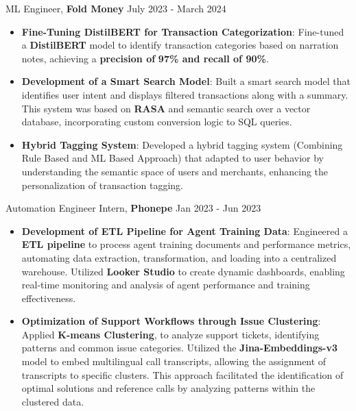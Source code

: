 \documentclass{article}%
\begin{document}
ML Engineer, \textbf {Fold Money} \hfill{July 2023 - March 2024}
\vspace{-1mm}
\begin{itemize}
\setlength\itemsep{0.01em}
 \item \textbf{Fine-Tuning DistilBERT for Transaction Categorization}: Fine-tuned a \textbf{DistilBERT} model to identify transaction categories based on narration notes, achieving a \textbf{precision of} \textbf{97\% and recall of 90\%}.
    \item \textbf{Development of a Smart Search Model}: Built a smart search model that identifies user intent and displays filtered transactions along with a summary. This system was based on \textbf{RASA} and semantic search over a vector database, incorporating custom conversion logic to SQL queries.
    \item \textbf{Hybrid Tagging System}: Developed a hybrid tagging system (Combining Rule Based and ML Based Approach) that adapted to user behavior by understanding the semantic space of users and merchants, enhancing the personalization of transaction tagging. 
    \hfill \href{https://fold.money/blog/automating-transaction-tagging}{\faGlobe}
\end{itemize}
\vspace{-1mm}
Automation Engineer Intern, \textbf {Phonepe} \hfill{Jan 2023 - Jun 2023}
\vspace{-1mm}
\begin{itemize}
\setlength\itemsep{0.01em}
\item \textbf{Development of ETL Pipeline for Agent Training Data}: Engineered a \textbf{ETL pipeline} to process agent training documents and performance metrics, automating data extraction, transformation, and loading into a centralized warehouse. Utilized \textbf{Looker Studio} to create dynamic dashboards, enabling real-time monitoring and analysis of agent performance and training effectiveness.
    \item \textbf{Optimization of Support Workflows through Issue Clustering}: Applied \textbf{K-means Clustering}, to analyze support tickets, identifying patterns and common issue categories. Utilized the \textbf{Jina-Embeddings-v3} model to embed multilingual call transcripts, allowing the assignment of transcripts to specific clusters. This approach facilitated the identification of optimal solutions and reference calls by analyzing patterns within the clustered data.
\end{itemize}
\vspace{-1mm}
\end{document}
